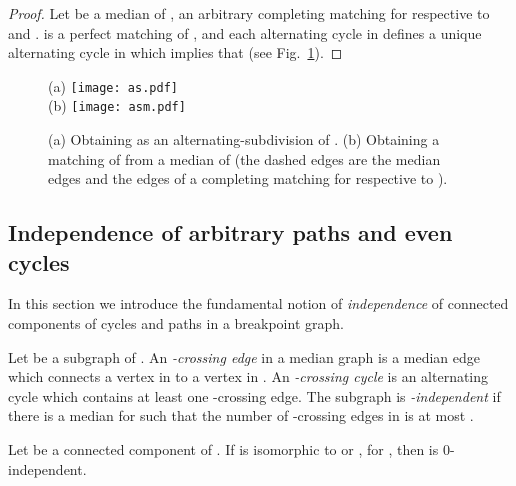 \documentclass[10pt]{llncs}
\begin{document}
\begin{proof}
  Let  be a median of ,  an arbitrary completing matching
  for  respective to  and .  is a perfect
  matching of , and each alternating cycle in  defines a
  unique alternating cycle in  which implies that
   (see Fig.~\ref{proofalsub}).
\end{proof} 

\begin{figure}[h]
  \begin{center}(a)
    \texttt{[image: as.pdf]} \\ (b)
    \texttt{[image: asm.pdf]}
    \caption{(a) Obtaining  as an alternating-subdivision of
      . (b) Obtaining a matching of  from a median of  (the
      dashed edges are the median edges and the edges of a completing
      matching for  respective to ).}
     \label{sub}
     \label{proofalsub}
  \end{center}
 \end{figure}








\subsection{Independence of arbitrary paths and even cycles}


In this section we introduce the fundamental notion of {\em
  independence} of connected components of cycles and paths in a
breakpoint graph. 

\begin{definition}\label{def:crossing-indep}
  Let  be a subgraph of . An {\em -crossing
    edge} in a median graph  is a median
  edge which connects a vertex in  to a vertex in . An {\em -crossing cycle} is an
  alternating cycle which contains at least one -crossing edge.
  The subgraph  is {\em -independent} if there is a median 
  for  such that the number of -crossing edges in  is at
  most .
\end{definition}


\begin{proposition}\label{indep}
  Let  be a connected component of . If  is isomorphic to
   or , for , then  is 0-independent.
\end{proposition}
\end{document}
